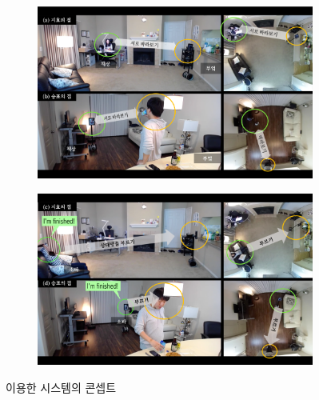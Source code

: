 \begin{figure}
\begin{subfigure}{.5\textwidth}
  \centering
  \includegraphics[width=\textwidth]{images/concept1}
\end{subfigure}
\begin{subfigure}{.5\textwidth}
  \centering
  \includegraphics[width=\textwidth]{images/concept2}
\end{subfigure}
\caption{ 이용한 시스템의 콘셉트}
\label{fig:concept}
\end{figure}


